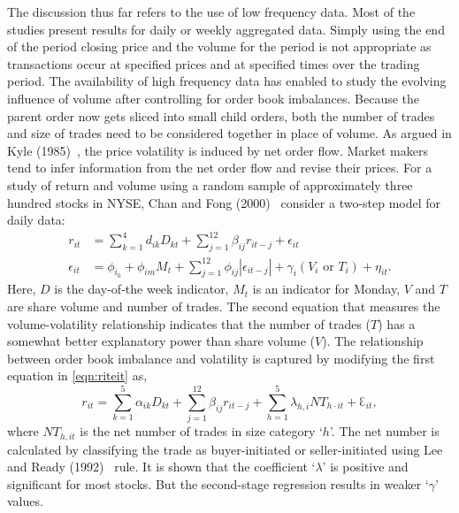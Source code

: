The discussion thus far refers to the use of low frequency data. Most of the studies present results for daily or weekly aggregated data. Simply using the end of the period closing price and the volume for the period is not appropriate as transactions occur at specified prices and at specified times over the trading period. The availability of high frequency data has enabled to study the evolving influence of volume after controlling for order book imbalances. Because the parent order now gets sliced into small child orders, both the number of trades and size of trades need to be considered together in place of volume. As argued in Kyle (1985)~\cite{kyle1985}, the price volatility is induced by net order flow. Market makers tend to infer information from the net order flow and revise their prices. For a study of return and volume using a random sample of approximately three hundred stocks in NYSE, Chan and Fong (2000)~\cite{chanfong} consider a two-step model for daily data: 
	\begin{equation} \label{eqn:riteit}
	\begin{aligned}
	r_{it} &= \sum_{k=1}^4 d_{ik} D_{kt} + \sum_{j=1}^{12} \beta_{ij} r_{it-j} + \epsilon_{it} \\
	\epsilon_{it} &= \phi_{i_0} + \phi_{im} M_t + \sum_{j=1}^{12} \phi_{ij} |\epsilon_{it-j}| + \gamma_i (V_i \text{ or }T_i) + \eta_{it}.
	\end{aligned}
	\end{equation}
Here, $D$ is the day-of-the week indicator, $M_t$ is an indicator for Monday, $V$ and $T$ are share volume and number of trades. The second equation that measures the volume-volatility relationship indicates that the number of trades ($T$) has a somewhat better explanatory power than share volume ($V$). The relationship between order book imbalance and volatility is captured by modifying the first equation in \eqref{eqn:riteit} as,
	\begin{equation} \label{eqn:rit32}
	r_{it}= \sum_{k=1}^5 \alpha_{ik} D_{kt} + \sum_{j=1}^{12} \beta_{ij} r_{it-j} + \sum_{h=1}^5 \lambda_{h,i} N T_{h\cdot it} + \Eulerconst_{it},
	\end{equation}
where $NT_{h,it}$ is the net number of trades in size category `$h$'. The net number is calculated by classifying the trade as buyer-initiated or seller-initiated using Lee and Ready (1992)~\cite{leeready} rule. It is shown that the coefficient `$\lambda$' is positive and significant for most stocks. But the second-stage regression results in weaker `$\gamma$' values. 


